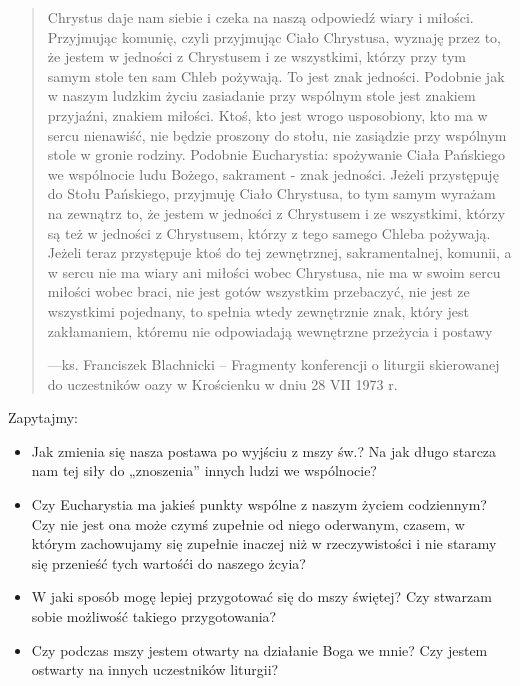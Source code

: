 \documentclass[a5paper,10pt,polish]{book}
\begin{document}
\begin{quote}
Chrystus daje nam siebie i czeka na naszą odpowiedź wiary i miłości. Przyjmując komunię, czyli przyjmując Ciało Chrystusa, wyznaję przez to, że jestem w jedności z Chrystusem i ze wszystkimi, którzy przy tym samym stole ten sam Chleb pożywają. To jest znak jedności. Podobnie jak w naszym ludzkim życiu zasiadanie przy wspólnym stole jest znakiem przyjaźni, znakiem miłości. Ktoś, kto jest wrogo usposobiony, kto ma w sercu nienawiść, nie będzie proszony do stołu, nie zasiądzie przy wspólnym stole w gronie rodziny. Podobnie Eucharystia: spożywanie Ciała Pańskiego we wspólnocie ludu Bożego, sakrament - znak jedności. Jeżeli przystępuję do Stołu Pańskiego, przyjmuję Ciało Chrystusa, to tym samym wyrażam na zewnątrz to, że jestem w jedności z Chrystusem i ze wszystkimi, którzy są też w jedności z Chrystusem, którzy z tego samego Chleba pożywają. Jeżeli teraz przystępuje ktoś do tej zewnętrznej, sakramentalnej, komunii, a w sercu nie ma wiary ani miłości wobec Chrystusa,  nie  ma  w  swoim sercu  miłości wobec braci, nie  jest gotów wszystkim przebaczyć, nie jest ze wszystkimi pojednany, to spełnia wtedy zewnętrznie znak, który jest zakłamaniem, któremu nie odpowiadają wewnętrzne przeżycia i postawy

\begin{flushright}
---ks. Franciszek Blachnicki -- Fragmenty konferencji o liturgii skierowanej do uczestników oazy w Krościenku w dniu 28 VII 1973 r.
\end{flushright}
\end{quote}

Zapytajmy:
\begin{itemize}
\item {} 
Jak zmienia się nasza postawa po wyjściu z mszy św.? Na jak długo starcza nam tej siły do „znoszenia” innych ludzi we wspólnocie?

\item {} 
Czy Eucharystia ma jakieś punkty wspólne z naszym życiem codziennym? Czy nie jest ona może czymś zupełnie od niego oderwanym, czasem, w którym zachowujamy się zupełnie inaczej niż w rzeczywistości i nie staramy się przenieść tych wartośći do naszego żcyia?

\item {} 
W jaki sposób mogę lepiej przygotować się do mszy świętej? Czy stwarzam sobie możliwość takiego przygotowania?

\item {} 
Czy podczas mszy jestem otwarty na działanie Boga we mnie? Czy jestem ostwarty na innych uczestników liturgii?

\end{itemize}
\end{document}
